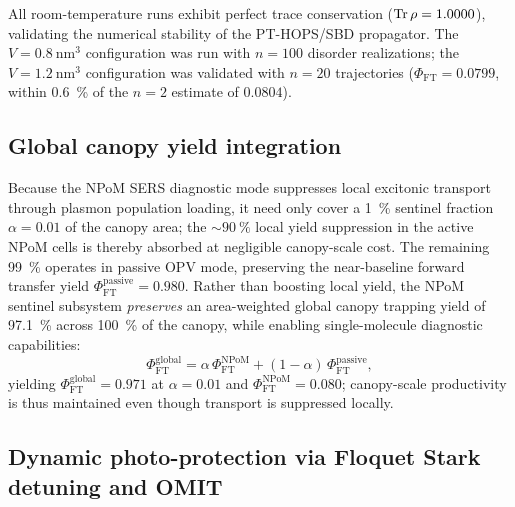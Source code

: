 \documentclass[12pt]{iopart}
\begin{document}
All room-temperature runs exhibit perfect trace conservation ($\Tr\rho = \num{1.0000 \pm 0.0000}$), validating the numerical stability of the PT-HOPS/SBD propagator. The $V=\qty{0.8}{\nm\cubed}$ configuration was run with $n=100$ disorder realizations; the $V=\qty{1.2}{\nm\cubed}$ configuration was validated with $n=20$ trajectories ($\Phi_{\mathrm{FT}} = 0.0799$, within \qty{0.6}{\percent} of the $n=2$ estimate of $0.0804$).

\subsection{Global canopy yield integration}

Because the NPoM SERS diagnostic mode suppresses local excitonic transport through plasmon population loading, it need only cover a \qty{1}{\percent} sentinel fraction $\alpha = 0.01$ of the canopy area; the $\sim\qty{90}{\percent}$ local yield suppression in the active NPoM cells is thereby absorbed at negligible canopy-scale cost. The remaining \qty{99}{\percent} operates in passive OPV mode, preserving the near-baseline forward transfer yield $\Phi_{\mathrm{FT}}^{\mathrm{passive}} = 0.980$. Rather than boosting local yield, the NPoM sentinel subsystem \emph{preserves} an area-weighted global canopy trapping yield of \qty{97.1}{\percent} across \qty{100}{\percent} of the canopy, while enabling single-molecule diagnostic capabilities:
\begin{equation}
  \Phi_{\mathrm{FT}}^{\mathrm{global}} = \alpha\,\Phi_{\mathrm{FT}}^{\mathrm{NPoM}} + (1-\alpha)\,\Phi_{\mathrm{FT}}^{\mathrm{passive}},
  \label{eq:phi_global}
\end{equation}
yielding $\Phi_{\mathrm{FT}}^{\mathrm{global}} = 0.971$ at $\alpha = 0.01$ and $\Phi_{\mathrm{FT}}^{\mathrm{NPoM}} = 0.080$; canopy-scale productivity is thus maintained even though transport is suppressed locally.

\subsection{Dynamic photo-protection via Floquet Stark detuning and OMIT}
\end{document}
